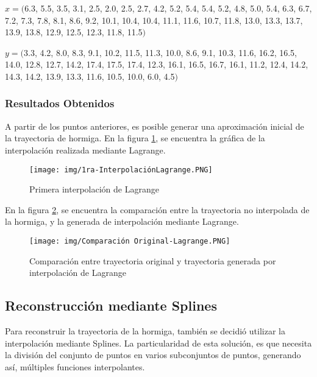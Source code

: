 \documentclass[conference]{IEEEtran}
\begin{document}
$x=($6.3, 5.5, 3.5, 3.1, 2.5, 2.0, 2.5, 2.7, 4.2, 5.2, 5.4, 5.4, 5.2, 4.8, 5.0, 5.4, 6.3, 6.7, 7.2, 7.3, 7.8, 8.1, 8.6, 9.2, 10.1, 10.4, 10.4, 11.1, 11.6, 10.7, 11.8, 13.0, 13.3, 13.7, 13.9, 13.8, 12.9, 12.5, 12.3, 11.8, 11.5$)$ \par

$y=($3.3, 4.2, 8.0, 8.3, 9.1, 10.2, 11.5, 11.3, 10.0, 8.6, 9.1, 10.3, 11.6, 16.2, 16.5, 14.0, 12.8, 12.7, 14.2, 17.4, 17.5, 17.4, 12.3, 16.1, 16.5, 16.7, 16.1, 11.2, 12.4, 14.2, 14.3, 14.2, 13.9, 13.3, 11.6, 10.5, 10.0, 6.0, 4.5$)$ \par

\subsubsection{Resultados Obtenidos}

A partir de los puntos anteriores, es posible generar una aproximación inicial de la trayectoria de hormiga. En la figura \ref{fig:lagrange-inicial}, se encuentra la gráfica de la interpolación realizada mediante Lagrange.\par

\newpage

\begin{figure}[ht!]
\centering
\texttt{[image: img/1ra-InterpolaciónLagrange.PNG]}
\vspace{-1em}
\caption{Primera interpolación de Lagrange}
\label{fig:lagrange-inicial}
\end{figure} 

En la figura \ref{fig:original-vs-lagrange}, se encuentra la comparación entre la trayectoria no interpolada de la hormiga, y la generada de interpolación mediante Lagrange.

\begin{figure}[ht!]
\centering
\texttt{[image: img/Comparación Original-Lagrange.PNG]}
\vspace{-1em}
\caption{Comparación entre trayectoria original y trayectoria generada por interpolación de Lagrange}
\label{fig:original-vs-lagrange}
\end{figure}

\subsection{Reconstrucción mediante Splines}

Para reconstruir la trayectoria de la hormiga, también se decidió utilizar la interpolación mediante Splines. La particularidad de esta solución, es que necesita la división del conjunto de puntos en varios subconjuntos de puntos, generando así, múltiples funciones interpolantes. \par
\end{document}
